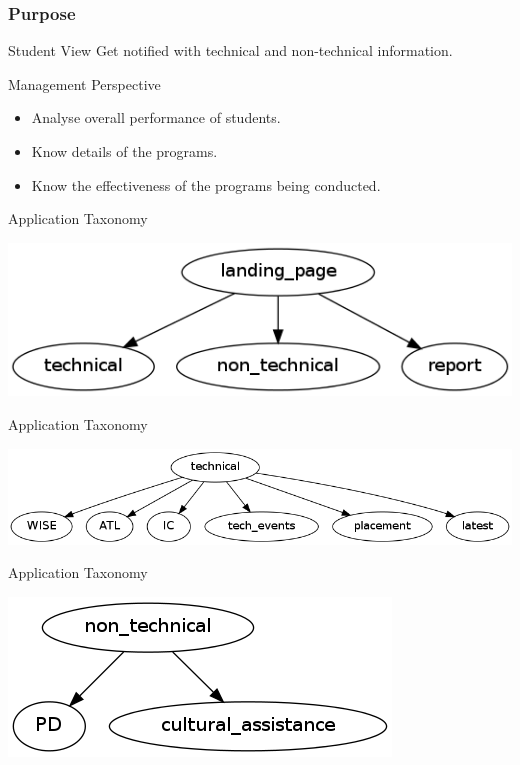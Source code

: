 \documentclass[14pt]{beamer}
\begin{document}
\begin{frame}
\frametitle{Purpose}
\begin{block}{Student View}
	Get notified with technical and non-technical information.
\end{block}
\begin{block}{Management Perspective}
	\begin{itemize}
		\item Analyse overall performance of students.
		\item Know details of the programs. 
		\item Know the effectiveness of the programs being conducted.
	\end{itemize}
\end{block}
\end{frame}

\begin{frame}{Application Taxonomy}
	\begin{center}
	\includegraphics[scale = 0.45]{spin.png}
	\end{center}
\end{frame}

\begin{frame}{Application Taxonomy}
	\begin{center}
	\includegraphics[scale = 0.38]{tech.png}
	\end{center}
\end{frame}

\begin{frame}{Application Taxonomy}
	\begin{center}
	\includegraphics[scale = 0.5]{nontech.png}
	\end{center}
\end{frame}
\end{document}
